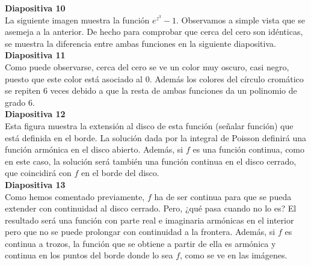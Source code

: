 \documentclass[spanish, a4paper, 12pt]{article}
\begin{document}
\textbf{Diapositiva 10} \\

La siguiente imagen muestra la función $e^{z^3}-1$. Observamos a simple vista que se asemeja a la anterior. De hecho para comprobar que cerca del cero son idénticas, se muestra la diferencia entre ambas funciones en la siguiente diapositiva. \\

\textbf{Diapositiva 11} \\

Como puede observarse, cerca del cero se ve un color muy oscuro, casi negro, puesto que este color está asociado al $0$. Además los colores del círculo cromático se repiten $6$ veces debido a que la resta de ambas funciones da un polinomio de grado $6$. \\

\textbf{Diapositiva 12} \\

Esta figura muestra la extensión al disco de esta función (señalar función) que está definida en el borde. La solución dada por la integral de Poisson definirá una función armónica en el disco abierto. Además, si $f$ es una función continua, como en este caso, la solución será también una función continua en el disco cerrado, que coincidirá con $f$ en el borde del disco. \\




\textbf{Diapositiva 13} \\

Como hemos comentado previamente, $f$ ha de ser continua para que se pueda extender con continuidad al disco cerrado. Pero, ¿qué pasa cuando no lo es? El resultado será una función con parte real e imaginaria armónicas en el interior pero que no se puede prolongar con continuidad a la frontera. Además, si $f$ es continua a trozos, la función que se obtiene a partir de ella es armónica y continua en los puntos del borde donde lo sea $f$, como se ve en las imágenes. \\
\end{document}
